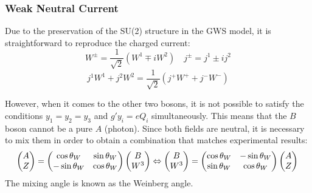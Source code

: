 \subsubsection{Weak Neutral Current}
Due to the preservation of the SU(2) structure in the GWS model,
it is straightforward to reproduce the charged current:
\begin{equation}
    W^\pm = \frac{1}{\sqrt{2}}(W^1 \mp iW^2)	\quad
    j^\pm = j^1 \pm ij^2
\end{equation}
\begin{equation}
    j^1W^1 + j^2W^2 = \frac{1}{\sqrt{2}}(j^+W^+ + j^-W^-)
\end{equation}

However, when it comes to the other two bosons, it is not possible to satisfy the conditions
$y_1 = y_2 = y_3$ and $g'y_i = eQ_i$ simultaneously. This means that the $B$ boson
cannot be a pure $A$ (photon). Since both fields are neutral, it is necessary
to mix them in order to obtain a combination that matches experimental results:
\begin{equation}
    \begin{pmatrix}
	A   \\
	Z   \\
    \end{pmatrix}
    =
    \begin{pmatrix}
	\cos\theta_W	& \sin\theta_W	\\
	-\sin\theta_W	& \cos\theta_W	\\
    \end{pmatrix}
    \begin{pmatrix}
	B   \\
	W^3 \\
    \end{pmatrix} 
    \Leftrightarrow
    \begin{pmatrix}
	B   \\
	W^3 \\
    \end{pmatrix}
    =
    \begin{pmatrix}
	\cos\theta_W	& -\sin\theta_W	\\
	\sin\theta_W	& \cos\theta_W	\\
    \end{pmatrix}
    \begin{pmatrix}
	A   \\
	Z	\\
    \end{pmatrix} \\
\end{equation}
The mixing angle is known as the Weinberg angle. 

